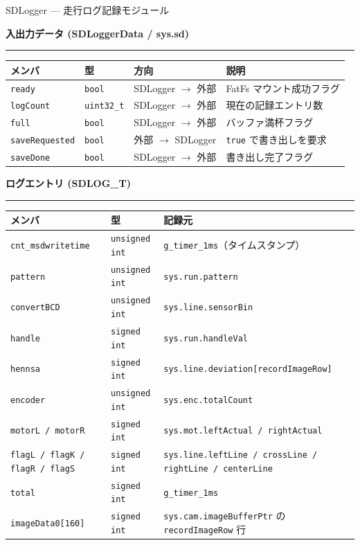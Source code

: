 \documentclass[a4paper,11pt,dvipdfmx]{jsarticle}
\makeatletter
\newcommand{\apisection}[1]{%
  \par\addvspace{4mm}%
  {\normalsize\bfseries\color{headerblue} #1}%
  \par\vspace{-1mm}%
  {\color{accentblue!40}\rule{\linewidth}{0.5pt}}%
  \par\nobreak\vspace{2mm}%
  \@afterheading
}
\makeatother
\begin{document}
\begin{apibox}{SDLogger --- 走行ログ記録モジュール}
\apisection{入出力データ (SDLoggerData / sys.sd)}

\begin{tabularx}{\textwidth}{l l l X}
\toprule
\textbf{メンバ} & \textbf{型} & \textbf{方向} & \textbf{説明} \\
\midrule
\texttt{ready}         & \texttt{bool}      & SDLogger $\rightarrow$ 外部 & FatFs マウント成功フラグ \\
\texttt{logCount}      & \texttt{uint32\_t} & SDLogger $\rightarrow$ 外部 & 現在の記録エントリ数 \\
\texttt{full}          & \texttt{bool}      & SDLogger $\rightarrow$ 外部 & バッファ満杯フラグ \\
\texttt{saveRequested} & \texttt{bool}      & 外部 $\rightarrow$ SDLogger & \texttt{true} で書き出しを要求 \\
\texttt{saveDone}      & \texttt{bool}      & SDLogger $\rightarrow$ 外部 & 書き出し完了フラグ \\
\bottomrule
\end{tabularx}

\apisection{ログエントリ (SDLOG\_T)}

\begin{tabularx}{\textwidth}{l l X}
\toprule
\textbf{メンバ} & \textbf{型} & \textbf{記録元} \\
\midrule
\texttt{cnt\_msdwritetime} & \texttt{unsigned int} & \texttt{g\_timer\_1ms}（タイムスタンプ） \\
\texttt{pattern}    & \texttt{unsigned int} & \texttt{sys.run.pattern} \\
\texttt{convertBCD} & \texttt{unsigned int} & \texttt{sys.line.sensorBin} \\
\texttt{handle}     & \texttt{signed int}   & \texttt{sys.run.handleVal} \\
\texttt{hennsa}     & \texttt{signed int}   & \texttt{sys.line.deviation[recordImageRow]} \\
\texttt{encoder}    & \texttt{unsigned int} & \texttt{sys.enc.totalCount} \\
\texttt{motorL / motorR} & \texttt{signed int} & \texttt{sys.mot.leftActual / rightActual} \\
\texttt{flagL / flagK / flagR / flagS} & \texttt{signed int} &
  \texttt{sys.line.leftLine / crossLine / rightLine / centerLine} \\
\texttt{total}      & \texttt{signed int}   & \texttt{g\_timer\_1ms} \\
\texttt{imageData0[160]} & \texttt{signed int} & \texttt{sys.cam.imageBufferPtr} の \texttt{recordImageRow} 行 \\
\bottomrule
\end{tabularx}


\end{apibox}
\end{document}
